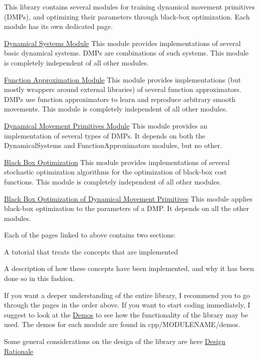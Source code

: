 This library contains several modules for training dynamical movement primitives (D\+M\+Ps), and optimizing their parameters through black-\/box optimization. Each module has its own dedicated page.

\begin{DoxyItemize}
\item \hyperlink{page_dyn_sys}{Dynamical Systems Module} This module provides implementations of several basic dynamical systems. D\+M\+Ps are combinations of such systems. This module is completely independent of all other modules.\end{DoxyItemize}
\begin{DoxyItemize}
\item \hyperlink{page_func_approx}{Function Approximation Module} This module provides implementations (but mostly wrappers around external libraries) of several function approximators. D\+M\+Ps use function approximators to learn and reproduce arbitrary smooth movements. This module is completely independent of all other modules.\end{DoxyItemize}
\begin{DoxyItemize}
\item \hyperlink{page_dmp}{Dynamical Movement Primitives Module} This module provides an implementation of several types of D\+M\+Ps. It depends on both the Dynamical\+Systems and Function\+Approximators modules, but no other.\end{DoxyItemize}
\begin{DoxyItemize}
\item \hyperlink{page_bbo}{Black Box Optimization} This module provides implementations of several stochastic optimization algorithms for the optimization of black-\/box cost functions. This module is completely independent of all other modules.\end{DoxyItemize}
\begin{DoxyItemize}
\item \hyperlink{page_dmp_bbo}{Black Box Optimization of Dynamical Movement Primitives} This module applies black-\/box optimization to the parameters of a D\+M\+P. It depends on all the other modules.\end{DoxyItemize}
Each of the pages linked to above contains two sections\+:

\begin{DoxyItemize}
\item A tutorial that treats the concepts that are implemented \item A description of how these concepts have been implemented, and why it has been done so in this fashion.\end{DoxyItemize}
If you want a deeper understanding of the entire library, I recommend you to go through the pages in the order above. If you want to start coding immediately, I suggest to look at the \hyperlink{group__Demos}{Demos} to see how the functionality of the library may be used. The demos for each module are found in cpp/\+M\+O\+D\+U\+L\+E\+N\+A\+M\+E/demos.

Some general considerations on the design of the library are here \hyperlink{page_design}{Design Rationale} 